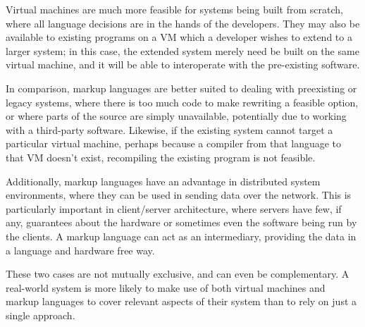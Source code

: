 \documentclass{sig-alternate}
\begin{document}
Virtual machines are much more feasible for systems being built from scratch, where all language decisions are in the hands of the developers. They may also be available to existing programs on a VM which a developer wishes to extend to a larger system; in this case, the extended system merely need be built on the same virtual machine, and it will be able to interoperate with the pre-existing software.

In comparison, markup languages are better suited to dealing with preexisting or legacy systems, where there is too much code to make rewriting a feasible option, or where parts of the source are simply unavailable, potentially due to working with a third-party software. Likewise, if the existing system cannot target a particular virtual machine, perhaps because a compiler from that language to that VM doesn't exist, recompiling the existing program is not feasible.

Additionally, markup languages have an advantage in distributed system environments, where they can be used in sending data over the network. This is particularly important in client/server architecture, where servers have few, if any, guarantees about the hardware or sometimes even the software being run by the clients. A markup language can act as an intermediary, providing the data in a language and hardware free way.


These two cases are not mutually exclusive, and can even be complementary. A real-world system is more likely to make use of both virtual machines and markup languages to cover relevant aspects of their system than to rely on just a single approach.










  
\end{document}
